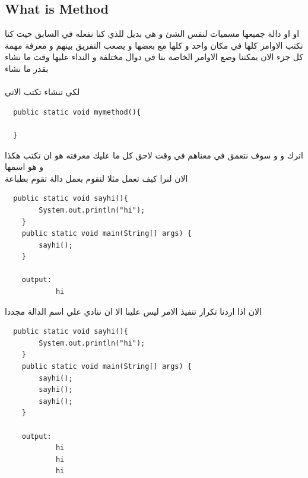 \subsection{What is Method}
\begin{AR}
 او  او دالة جميعها مسميات لنفس الشئ
و هي  بديل للذي كنا نفعله في السابق حيث كنا نكتب الاوامر كلها في مكان واحد و كلها 
مع بعضها و يصعب التفريق بينهم و معرفة مهمة كل جزء 
الان يمكننا وضع الاوامر الخاصة بنا في دوال مختلفة و النداء عليها وقت ما نشاء بقدر ما نشاء
\\\\
لكي تنشاء  تكتب الاتي 
\end{AR}
\begin{verbatim}
  public static void mymethod(){
    
  }
\end{verbatim}
\begin{AR}
اترك  و  و  سوف نتعمق في معناهم في وقت لاحق كل ما عليك معرفته هو
ان  تكتب هكذا و  هو اسمها
\\
الان لنرا كيف تعمل مثلا لنقوم بعمل دالة تقوم بطباعة 
\end{AR}
\begin{verbatim}
  public static void sayhi(){
        System.out.println("hi");
    }
    public static void main(String[] args) {
        sayhi();
    }

    output:
            hi
\end{verbatim}
\begin{AR}
الان اذا اردنا تكرار تنفيذ الامر ليس علينا الا ان ننادي علي اسم الدالة مجددا
\end{AR}
\begin{verbatim}
  public static void sayhi(){
        System.out.println("hi");
    }
    public static void main(String[] args) {
        sayhi();
        sayhi();
        sayhi();
    }

    output:
            hi
            hi
            hi
\end{verbatim}
